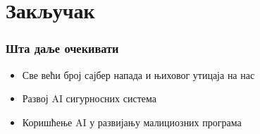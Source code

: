 \documentclass{beamer}
\begin{document}
\section{Закључак}
	\begin{frame}\frametitle{Шта даље очекивати}
		\begin{itemize}
			\item Све већи број сајбер напада и њиховог утицаја на нас
			\item Развој AI сигурносних система
			\item Коришћење AI у развијању малициозних програма
		\end{itemize}
	\end{frame}
\end{document}
